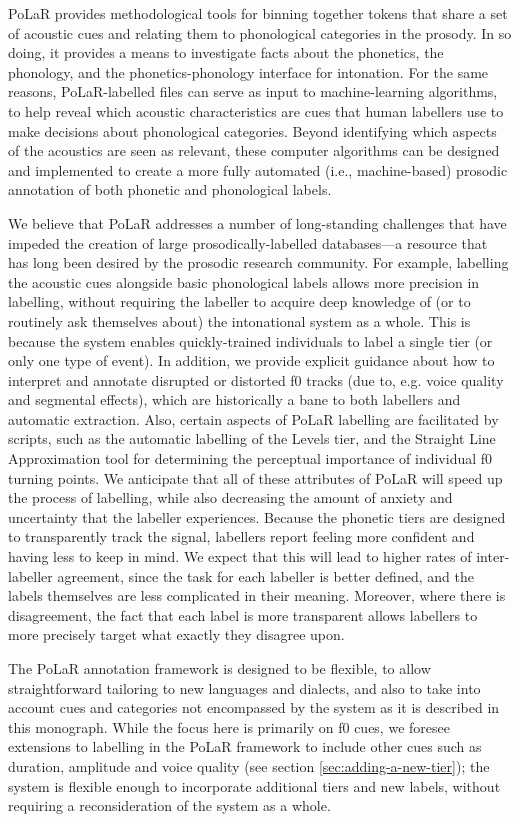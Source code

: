 \documentclass[11pt, twoside]{memoir}
\begin{document}
PoLaR provides methodological tools for binning together tokens that share a set of acoustic cues and relating them to phonological categories in the prosody. In so doing, it provides a means to investigate facts about the phonetics, the phonology, and the phonetics-phonology interface for intonation. For the same reasons, PoLaR-labelled files can serve as input to machine-learning algorithms, to help reveal which acoustic characteristics are cues that human labellers use to make decisions about phonological categories. Beyond identifying which aspects of the acoustics are seen as relevant, these computer algorithms can be designed and implemented to create a more fully automated (i.e., machine-based) prosodic annotation of both phonetic and phonological labels. 

We believe that PoLaR addresses a number of long-standing challenges that have impeded the creation of large prosodically-labelled databases---a resource that has long been desired by the prosodic research community.  For example, labelling the acoustic cues alongside basic phonological labels allows more precision in labelling, without requiring the labeller to acquire deep knowledge of (or to routinely ask themselves about) the intonational system as a whole. This is because the system enables quickly-trained individuals to label a single tier (or only one type of event). In addition, we provide explicit guidance about how to interpret and annotate disrupted or distorted f0 tracks (due to, e.g. voice quality and segmental effects), which are historically a bane to both labellers and automatic extraction.  Also, certain aspects of PoLaR labelling are facilitated by scripts, such as the automatic labelling of the Levels tier, and the Straight Line Approximation tool for determining the perceptual importance of individual f0 turning points. We anticipate that all of these attributes of PoLaR will speed up the process of labelling, while also decreasing the amount of anxiety and uncertainty that the labeller experiences. Because the phonetic tiers are designed to transparently track the signal, labellers report feeling more confident and having less to keep in mind. We expect that this will lead to higher rates of inter-labeller agreement, since the task for each labeller is better defined, and the labels themselves are less complicated in their meaning. Moreover, where there is disagreement, the fact that each label is more transparent allows labellers to more precisely target what exactly they disagree upon. 

The PoLaR annotation framework is designed to be flexible, to allow straightforward tailoring to new languages and dialects, and also to take into account cues and categories not encompassed by the system as it is described in this monograph. While the focus here is primarily on f0 cues, we foresee extensions to labelling in the PoLaR framework to include other cues such as duration, amplitude and voice quality (see section \ref{sec:adding-a-new-tier}); the system is flexible enough to incorporate additional tiers and new labels, without requiring a reconsideration of the system as a whole.
\end{document}

